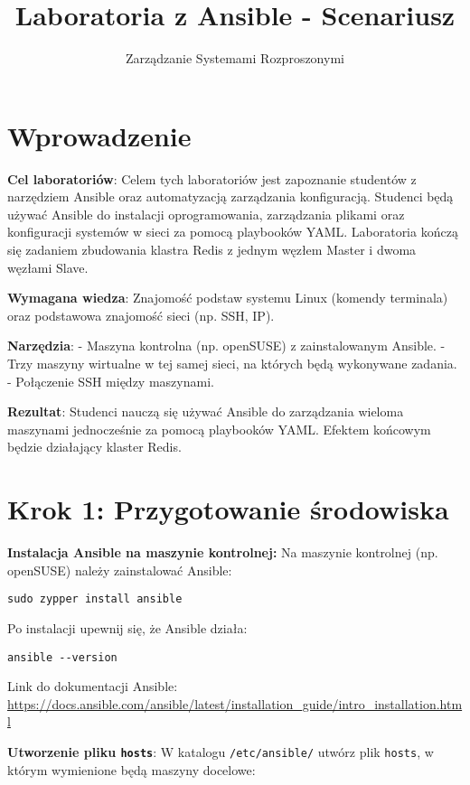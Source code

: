 \documentclass{article}
\title{Laboratoria z Ansible - Scenariusz}
\author{Zarządzanie Systemami Rozproszonymi}
\begin{document}
\maketitle

\section*{Wprowadzenie}

\textbf{Cel laboratoriów}:  
Celem tych laboratoriów jest zapoznanie studentów z narzędziem Ansible oraz automatyzacją zarządzania konfiguracją. Studenci będą używać Ansible do instalacji oprogramowania, zarządzania plikami oraz konfiguracji systemów w sieci za pomocą playbooków YAML. Laboratoria kończą się zadaniem zbudowania klastra Redis z jednym węzłem Master i dwoma węzłami Slave.

\textbf{Wymagana wiedza}:  
Znajomość podstaw systemu Linux (komendy terminala) oraz podstawowa znajomość sieci (np. SSH, IP).

\textbf{Narzędzia}:  
- Maszyna kontrolna (np. openSUSE) z zainstalowanym Ansible.
- Trzy maszyny wirtualne w tej samej sieci, na których będą wykonywane zadania.
- Połączenie SSH między maszynami.

\textbf{Rezultat}:  
Studenci nauczą się używać Ansible do zarządzania wieloma maszynami jednocześnie za pomocą playbooków YAML. Efektem końcowym będzie działający klaster Redis.

\section{Krok 1: Przygotowanie środowiska}

\textbf{Instalacja Ansible na maszynie kontrolnej:}  
Na maszynie kontrolnej (np. openSUSE) należy zainstalować Ansible:

\begin{lstlisting}
sudo zypper install ansible
\end{lstlisting}

Po instalacji upewnij się, że Ansible działa:

\begin{lstlisting}
ansible --version
\end{lstlisting}

Link do dokumentacji Ansible:  
\url{https://docs.ansible.com/ansible/latest/installation_guide/intro_installation.html}

\textbf{Utworzenie pliku \texttt{hosts}}:  
W katalogu \texttt{/etc/ansible/} utwórz plik \texttt{hosts}, w którym wymienione będą maszyny docelowe:
\end{document}
